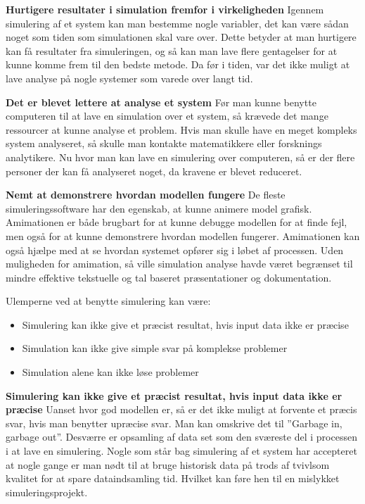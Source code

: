\textbf{Hurtigere resultater i simulation fremfor i virkeligheden}
Igennem simulering af et system kan man bestemme nogle variabler, det kan være sådan noget som tiden som simulationen skal vare over. Dette betyder at man hurtigere kan få resultater fra simuleringen, og så kan man lave flere gentagelser for at kunne komme frem til den bedste metode. Da før i tiden, var det ikke muligt at lave analyse på nogle systemer som varede over langt tid.

\vspace{5mm}

\textbf{Det er blevet lettere at analyse et system}
Før man kunne benytte computeren til at lave en simulation over et system, så krævede det mange ressourcer at kunne analyse et problem. Hvis man skulle have en meget kompleks system analyseret, så skulle man kontakte matematikkere eller forsknings analytikere. Nu hvor man kan lave en simulering over computeren, så er der flere personer der kan få analyseret noget, da kravene er blevet reduceret.

\vspace{5mm}

\textbf{Nemt at demonstrere hvordan modellen fungere}
 De fleste simuleringssoftware har den egenskab, at kunne animere model grafisk. Amimationen er både brugbart for at kunne debugge modellen for at finde fejl, men også for at kunne demonstrere hvordan modellen fungerer. Amimationen kan også hjælpe med at se hvordan systemet opfører sig i løbet af processen. Uden muligheden for amimation, så ville simulation analyse havde været begrænset til mindre effektive tekstuelle og tal baseret præsentationer og dokumentation.

\vspace{5mm}
Ulemperne ved at benytte simulering kan være:
\begin{itemize}
\item Simulering kan ikke give et præcist resultat, hvis input data ikke er præcise
\item Simulation kan ikke give simple svar på komplekse problemer
\item Simulation alene kan ikke løse problemer
\end{itemize}

\vspace{5mm}

\textbf{Simulering kan ikke give et præcist resultat, hvis input data ikke er præcise}
Uanset hvor god modellen er, så er det ikke muligt at forvente et præcis svar, hvis man benytter upræcise svar. Man kan omskrive det til ”Garbage in, garbage out”. Desværre er opsamling af data set som den sværeste del i processen i at lave en simulering. Nogle som står bag simulering af et system har accepteret at nogle gange er man nødt til at bruge historisk data på trods af tvivlsom kvalitet for at spare dataindsamling tid. Hvilket kan føre hen til en mislykket simuleringsprojekt.

